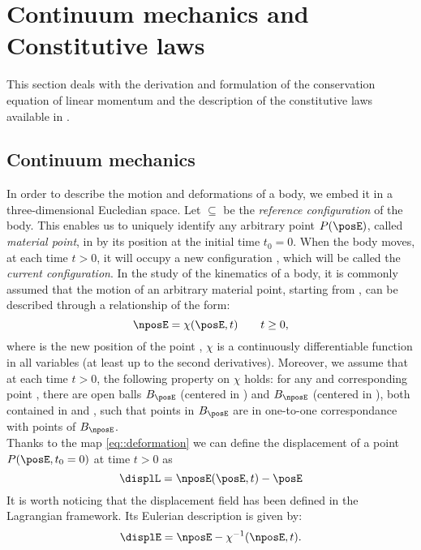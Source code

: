\section{Continuum mechanics and Constitutive laws}
This section deals with the derivation and formulation of the conservation equation of linear momentum and the description of the constitutive laws available in \LV.

\subsection{Continuum mechanics}
\label{sct-Continuum}
In order to describe the motion and deformations of a body, we embed it in a three-dimensional Eucledian space. Let \RefCon $\subseteq$ \Real be the \textit{reference configuration} of the body. This enables us to uniquely identify any arbitrary point $P(\posE)$, called \textit{material point}, in \RefCon by its position at the initial time $t_0=0$. When the body moves, at each time $t>0$, it will occupy a new configuration \CurCon, which will be called the \textit{current configuration}. In the study of the kinematics of a body, it is commonly assumed that the motion of an arbitrary material point, starting from \pos, can be described through a relationship of the form:
\begin{equation}
  \nposE=\chi(\posE,t)\qquad t\geq0,
  \label{eq::deformation}
\end{equation}
where \npos is the new position of the point \pos, $\chi$ is a continuously differentiable function in all variables (at least up to the second derivatives). Moreover, we assume that at each time $t>0$, the following property on $\chi$ holds: for any \pos  and corresponding point \npos, there are open balls $B_{\posE}$ (centered in \pos) and $B_{\nposE}$ (centered in \npos), both contained in \RefCon and \CurCon, such that points in $B_{\posE}$ are in one-to-one correspondance with points of $B_{\nposE}$.\\
Thanks to the map \eqref{eq::deformation} we can define the displacement of a point $P(\posE,t_0=0)$ at time $t>0$ as
\begin{equation}
  \displL=\nposE(\posE,t)-\posE
\label{eq::displacementL}
\end{equation}
It is worth noticing that the displacement field has been defined in the Lagrangian framework. Its Eulerian description is given by:
\begin{equation}
  \displE=\nposE-\chi^{-1}(\nposE,t).
  \label{eq::displacementE}
\end{equation}
